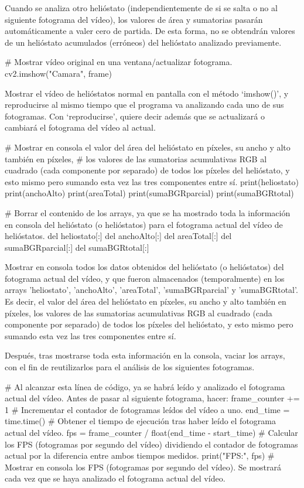 \documentclass[12pt]{article}
\begin{document}
Cuando se analiza otro helióstato (independientemente de si se salta o no al siguiente fotograma del vídeo), los valores de área y sumatorias pasarán automáticamente a valer cero de partida. De esta forma, no se obtendrán valores de un helióstato acumulados (erróneos) del helióstato analizado previamente.


\# Mostrar vídeo original en una ventana/actualizar fotograma.
cv2.imshow("Camara", frame)

Mostrar el vídeo de helióstatos normal en pantalla con el método ‘imshow()’, y reproducirse al mismo tiempo que el programa va analizando cada uno de sus fotogramas. Con ‘reproducirse’, quiere decir además que se actualizará o cambiará el fotograma del vídeo al actual.


\# Mostrar en consola el valor del área del helióstato en píxeles, su ancho y alto también en píxeles,
\# los valores de las sumatorias acumulativas RGB al cuadrado (cada componente por separado) de todos los píxeles del helióstato, y esto mismo pero sumando esta vez las tres componentes entre sí.
    print(heliostato)
    print(anchoAlto)
    print(areaTotal)
    print(sumaBGRparcial)
    print(sumaBGRtotal)

\# Borrar el contenido de los arrays, ya que se ha mostrado toda la información en consola del helióstato (o helióstatos) para el fotograma actual del vídeo de helióstatos.
    del heliostato[:]
    del anchoAlto[:]
    del areaTotal[:]
    del sumaBGRparcial[:]
    del sumaBGRtotal[:]
    
Mostrar en consola todos los datos obtenidos del helióstato (o helióstatos) del fotograma actual del vídeo, y que fueron almacenados (temporalmente) en los arrays 'heliostato', 'anchoAlto', 'areaTotal', 'sumaBGRparcial' y 'sumaBGRtotal'. Es decir, el valor del área del helióstato en píxeles, su ancho y alto también en píxeles, los valores de las sumatorias acumulativas RGB al cuadrado (cada componente por separado) de todos los píxeles del helióstato, y esto mismo pero sumando esta vez las tres componentes entre sí.

Después, tras mostrarse toda esta información en la consola, vaciar los arrays, con el fin de reutilizarlos para el análisis de los siguientes fotogramas.


\# Al alcanzar esta línea de código, ya se habrá leído y analizado el fotograma actual del vídeo. Antes de pasar al siguiente fotograma, hacer:
    frame\_counter += 1 \# Incrementar el contador de fotogramas leídos del vídeo a uno.
    end\_time = time.time() \# Obtener el tiempo de ejecución tras haber leído el fotograma actual del vídeo.
    fps = frame\_counter / float(end\_time - start\_time) \# Calcular los FPS (fotogramas por segundo del vídeo) dividiendo el contador de fotogramas actual por la diferencia entre ambos tiempos medidos.
    print("FPS:", fps) \# Mostrar en consola los FPS (fotogramas por segundo del vídeo). Se mostrará cada vez que se haya analizado el fotograma actual del vídeo.
\end{document}
